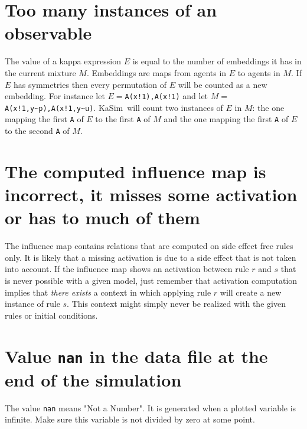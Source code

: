 \documentclass[11pt]{book}
\def\KaSim{\textsf{KaSim}}
\def\int{\hbox{\texttt{\~}}}
\def\ttt#1{\texttt{#1}}
\begin{document}
\section*{Too many instances of an observable}
The value of a kappa expression $E$  is equal to the number of embeddings it has in the current mixture $M$. Embeddings are maps from agents in $E$  to agents in $M$. If $E$ has symmetries then every permutation of $E$ will be counted as a new embedding. For instance let $E=$\ttt{A(x!1),A(x!1)} and let $M=$\ttt{A(x!1,y\int p),A(x!1,y\int u)}. \KaSim~will count two instances of $E$ in $M$: the one mapping the first \ttt{A} of $E$ to the first \ttt{A} of $M$ and the one mapping the first \ttt{A} of $E$ to the second \ttt{A} of $M$.
 
\section*{The computed influence map is incorrect, it misses some activation or has to much of them}
The influence map contains relations that are computed on side effect free rules only. It is likely that a missing activation is due to a side effect that is not taken into account. If the influence map shows an activation between rule $r$ and $s$ that is never possible with a given model, just remember that activation computation implies that \emph{there exists} a context in which applying rule $r$ will create a new instance of rule $s$. This context might simply never be realized with the given rules or initial conditions.

\section*{Value \ttt{nan} in the data file at the end of the simulation}
The value \ttt{nan} means "Not a Number". It is generated when a plotted variable is infinite. Make sure this variable is not divided by zero at some point.


 

\printindex
\end{document}

